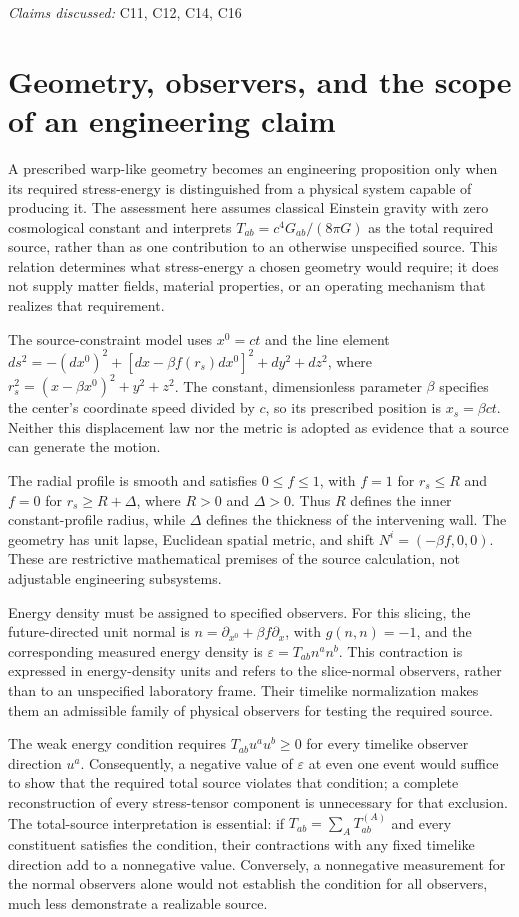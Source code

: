 \documentclass[11pt]{article}
\begin{document}
\textit{Claims discussed: }C11, C12, C14, C16
\section{Geometry, observers, and the scope of an engineering claim}
A prescribed warp-like geometry becomes an engineering proposition only when its required stress-energy is distinguished from a physical system capable of producing it. The assessment here assumes classical Einstein gravity with zero cosmological constant and interprets $T_{ab}=c^4G_{ab}/(8\pi G)$ as the total required source, rather than as one contribution to an otherwise unspecified source. This relation determines what stress-energy a chosen geometry would require; it does not supply matter fields, material properties, or an operating mechanism that realizes that requirement.

The source-constraint model uses $x^0=ct$ and the line element $ds^2=-(dx^0)^2+[dx-\beta f(r_s)dx^0]^2+dy^2+dz^2$, where $r_s^2=(x-\beta x^0)^2+y^2+z^2$. The constant, dimensionless parameter $\beta$ specifies the center’s coordinate speed divided by $c$, so its prescribed position is $x_s=\beta ct$. Neither this displacement law nor the metric is adopted as evidence that a source can generate the motion.

The radial profile is smooth and satisfies $0\leq f\leq1$, with $f=1$ for $r_s\leq R$ and $f=0$ for $r_s\geq R+\Delta$, where $R>0$ and $\Delta>0$. Thus $R$ defines the inner constant-profile radius, while $\Delta$ defines the thickness of the intervening wall. The geometry has unit lapse, Euclidean spatial metric, and shift $N^i=(-\beta f,0,0)$. These are restrictive mathematical premises of the source calculation, not adjustable engineering subsystems.

Energy density must be assigned to specified observers. For this slicing, the future-directed unit normal is $n=\partial_{x^0}+\beta f\partial_x$, with $g(n,n)=-1$, and the corresponding measured energy density is $\varepsilon=T_{ab}n^an^b$. This contraction is expressed in energy-density units and refers to the slice-normal observers, rather than to an unspecified laboratory frame. Their timelike normalization makes them an admissible family of physical observers for testing the required source.

The weak energy condition requires $T_{ab}u^au^b\geq0$ for every timelike observer direction $u^a$. Consequently, a negative value of $\varepsilon$ at even one event would suffice to show that the required total source violates that condition; a complete reconstruction of every stress-tensor component is unnecessary for that exclusion. The total-source interpretation is essential: if $T_{ab}=\sum_A T^{(A)}_{ab}$ and every constituent satisfies the condition, their contractions with any fixed timelike direction add to a nonnegative value. Conversely, a nonnegative measurement for the normal observers alone would not establish the condition for all observers, much less demonstrate a realizable source.
\end{document}
